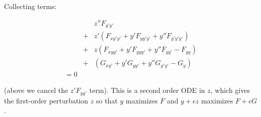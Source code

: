 \documentclass[pdflatex,sn-mathphys-num]{sn-jnl}%
\theoremstyle{thmstyleone}%
\theoremstyle{thmstyletwo}%
\theoremstyle{thmstylethree}%
\begin{document}
Collecting terms:

\begin{eqnarray}
&{}& z''F_{y'y'}\\
&+& z'(F_{xy'y'} + y'F_{yy'y'} + y''F_{y'y'y'})\\
&+& z (F_{xyy'} + y'F_{yyy'} + y''F_{yy'}-F_{yy})\\
&+& (G_{xy'} + y'G_{yy'} + y''G_{y'y'}- G_{y})\\
= 0
\end{eqnarray}

(above we cancel the $z'F_{yy'}$ term). This is a second order ODE in
$z$, which gives the first-order perturbation $z$ so that $y$
maximizes $F$ and $y+\epsilon z$ maximizes $F+\epsilon G$.

\end{document}
